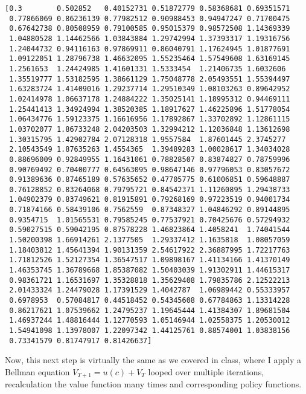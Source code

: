 \documentclass[11pt]{article}
\begin{document}
    \begin{Verbatim}[commandchars=\\\{\}]
[0.3        0.502852   0.40152731 0.51872779 0.58368681 0.69351571
 0.77866069 0.86236139 0.77982512 0.90988453 0.94947247 0.71700475
 0.67642738 0.80508959 0.79100585 0.95015379 0.98572508 1.14369339
 1.04880528 1.14462566 1.03843884 1.29742994 1.37393317 1.19316756
 1.24044732 0.94116163 0.97869911 0.86040791 1.17624945 1.01877691
 1.09122051 1.28796738 1.46632095 1.55235464 1.57549608 1.63169145
 1.2561653  1.24424985 1.41601331 1.5333454  1.21406735 1.6032606
 1.35519777 1.53182595 1.38661129 1.75048778 2.05493551 1.55394497
 1.63283724 1.41409016 1.29237714 1.29510349 1.08103263 0.89642952
 1.02414978 1.06637178 1.24884222 1.35025141 1.18995312 0.94469111
 1.25441413 1.34924994 1.38520385 1.18917627 1.46225896 1.51778054
 1.06434776 1.59123375 1.16616956 1.17892867 1.33702892 1.12861115
 1.03702077 1.86733248 2.04203503 1.32994212 1.12036848 1.13612698
 1.30315795 1.42902784 2.07128318 1.9557584  1.87601445 2.3745277
 2.10543549 1.87635263 1.4554365  1.39489283 1.00028617 1.34034028
 0.88696009 0.92849955 1.16431061 0.78828507 0.83874827 0.78759996
 0.90769492 0.70400777 0.64563095 0.98647146 0.97796053 0.83057672
 0.91389636 0.87465189 0.57635652 0.47705775 0.61006851 0.59648887
 0.76128852 0.83264068 0.79795721 0.84542371 1.11260895 1.29438733
 1.04902379 0.83749621 0.81915891 0.79268169 0.97223519 0.94001734
 0.71874166 0.58439106 0.7562559  0.87348327 1.04846292 0.89144895
 0.9354715  1.01565531 0.79585245 0.77537921 0.70425676 0.57294932
 0.59027515 0.59042195 0.87578228 1.46823864 1.4058241  1.74041544
 1.50200398 1.66914261 2.1377505  1.29337412 1.1635818  1.08057059
 1.18403812 1.45641394 1.90131359 2.54617922 2.36887995 1.72217763
 1.71812526 1.52127354 1.36547517 1.09898167 1.41134166 1.41370149
 1.46353745 1.36789668 1.85387082 1.50403039 1.91302911 1.44615317
 0.98361721 1.16531697 1.35328818 1.35629408 1.79835786 2.12522213
 2.01433324 1.24479028 1.17391529 1.4042787  1.06989442 0.55333957
 0.6978953  0.57084817 0.44518452 0.54345608 0.67784863 1.13314228
 0.86217621 1.07539662 1.24795237 1.19645444 1.41384307 1.89681504
 1.46937244 1.48816444 1.12770593 1.05146944 1.02558375 1.20530012
 1.54941098 1.13978007 1.22097342 1.44125761 0.88574001 1.03838156
 0.73341579 0.81747917 0.81426637]

    \end{Verbatim}

    Now, this next step is virtually the same as we covered in class, where
I apply a Bellman equation \(V_{T+1} = u(c) + V_{T}\) looped over
multiple iterations, recalculation the value function many times and
corresponding policy functions.
\end{document}
